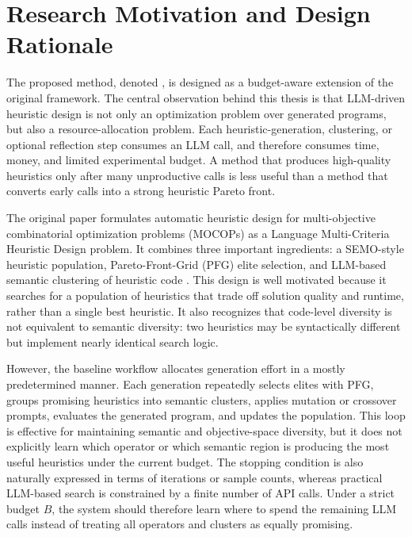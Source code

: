 \documentclass[../main.tex]{subfiles}
\begin{document}
\providecommand{\methodcode}[1]{\code{#1}}

\section{Research Motivation and Design Rationale}

The proposed method, denoted \bmab{}, is designed as a budget-aware extension of the original \mpage{} framework. The central observation behind this thesis is that LLM-driven heuristic design is not only an optimization problem over generated programs, but also a resource-allocation problem. Each heuristic-generation, clustering, or optional reflection step consumes an LLM call, and therefore consumes time, money, and limited experimental budget. A method that produces high-quality heuristics only after many unproductive calls is less useful than a method that converts early calls into a strong heuristic Pareto front.

The original \mpage{} paper formulates automatic heuristic design for multi-objective combinatorial optimization problems (MOCOPs) as a Language Multi-Criteria Heuristic Design problem. It combines three important ingredients: a SEMO-style heuristic population, Pareto-Front-Grid (PFG) elite selection, and LLM-based semantic clustering of heuristic code \cite{ha2026mpage,laumanns2004semo}. This design is well motivated because it searches for a population of heuristics that trade off solution quality and runtime, rather than a single best heuristic. It also recognizes that code-level diversity is not equivalent to semantic diversity: two heuristics may be syntactically different but implement nearly identical search logic.

However, the baseline \mpage{} workflow allocates generation effort in a mostly predetermined manner. Each generation repeatedly selects elites with PFG, groups promising heuristics into semantic clusters, applies mutation or crossover prompts, evaluates the generated program, and updates the population. This loop is effective for maintaining semantic and objective-space diversity, but it does not explicitly learn which operator or which semantic region is producing the most useful heuristics under the current budget. The stopping condition is also naturally expressed in terms of iterations or sample counts, whereas practical LLM-based search is constrained by a finite number of API calls. Under a strict budget $B$, the system should therefore learn where to spend the remaining LLM calls instead of treating all operators and clusters as equally promising.
\end{document}
